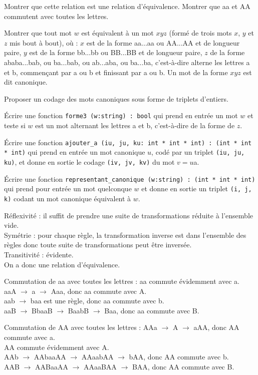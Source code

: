 \Q
Montrer que cette relation est une relation d'équivalence. Montrer que aa et AA commutent avec toutes les lettres.

\Q
Montrer que tout mot $w$ est équivalent à un mot $xyz$ (formé de trois mots $x$, $y$ et $z$ mis bout à bout), où : $x$ est de la forme aa...aa ou AA...AA et de longueur paire, $y$ est de la forme bb...bb ou BB...BB et de longueur paire, $z$ de la forme ababa...bab, ou ba...bab, ou ab...aba, ou ba...ba, c'est-à-dire alterne les lettres a et b, commençant par a ou b et finissant par a ou b. Un mot de la forme $xyz$ est dit canonique.

\Q
Proposer un codage des mots canoniques sous forme de triplets d'entiers.

\Q
Écrire une fonction \texttt{forme3 (w:string) : bool} qui prend en entrée un mot $w$ et teste si $w$ est un mot alternant les lettres a et b, c'est-à-dire de la forme de $z$.

\Q
Écrire une fonction \texttt{ajouter\_a (iu, ju, ku: int * int * int) : (int * int * int)} qui prend en entrée un mot canonique $u$, codé par un triplet \texttt{(iu, ju, ku)}, et donne en sortie le codage \texttt{(iv, jv, kv)} du mot $v=u$a.

\Q
Écrire une fonction \texttt{representant\_canonique (w:string) : (int * int * int)} qui prend pour entrée un mot quelconque $w$ et donne en sortie un triplet \texttt{(i, j, k)} codant un mot canonique équivalent à $w$.

\Corrige

\Q
Réflexivité : il suffit de prendre une suite de transformations réduite à l'ensemble vide.\\
Symétrie : pour chaque règle, la transformation inverse est dans l'ensemble des règles donc toute suite de transformations peut être inversée.\\
Transitivité : évidente.\\
On a donc une relation d'équivalence.
\bigskip

Commutation de aa avec toutes les lettres : aa commute évidemment avec a.\\
aaA $\rightarrow$ a $\rightarrow$ Aaa, donc aa commute avec A.\\
aab $\rightarrow$ baa est une règle, donc aa commute avec b.\\
aaB $\rightarrow$ BbaaB $\rightarrow$ BaabB $\rightarrow$ Baa, donc aa commute avec B.
\bigskip

Commutation de AA avec toutes les lettres : AAa $\rightarrow$ A $\rightarrow$ aAA, donc AA commute avec a.\\
AA commute évidemment avec A.\\
AAb $\rightarrow$ AAbaaAA $\rightarrow$ AAaabAA $\rightarrow$ bAA, donc AA commute avec b.\\
AAB $\rightarrow$ AABaaAA $\rightarrow$ AAaaBAA $\rightarrow$ BAA, donc AA commute avec B.
\medskip

